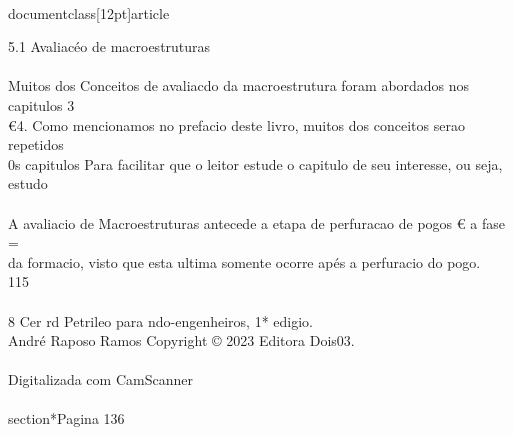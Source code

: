 \\documentclass[12pt]{article}
\begin{document}
5.1 Avaliacéo de macroestruturas\\
\\
Muitos dos Conceitos de avaliacdo da macroestrutura foram abordados nos capitulos 3\\
€4. Como mencionamos no prefacio deste livro, muitos dos conceitos serao repetidos\\
0s capitulos Para facilitar que o leitor estude o capitulo de seu interesse, ou seja, estudo\\
\\
A avaliacio de Macroestruturas antecede a etapa de perfuracao de pogos € a fase =\\
da formacio, visto que esta ultima somente ocorre apés a perfuracio do pogo.\\
115\\
\\
8 Cer rd Petrileo para ndo-engenheiros, 1* edigio.\\
André Raposo Ramos Copyright © 2023 Editora Dois03.\\
\\
Digitalizada com CamScanner\\

\\section*{Pagina 136}
\end{document}
